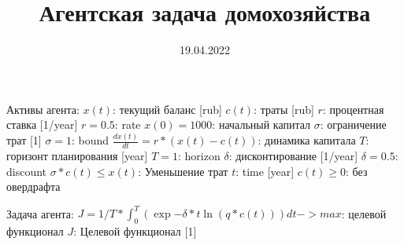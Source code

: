 \documentclass{a_model}
\title{Агентская задача домохозяйства}
\date{19.04.2022}
\begin{document}
Активы агента:
    $x(t)$: текущий баланс [rub]
    $c(t)$: траты [rub]
    $r$: процентная ставка [1/year]
    $r= 0.5$: rate
    $x(0) = 1000$: начальный капитал
    $\sigma$: ограничение трат [1]
    $\sigma = 1$: bound
    $\frac{dx(t)}{dt} = r*(x(t)-c(t))$: динамика капитала
    $T$: горизонт планирования [year]
    $T = 1$: horizon
    $\delta$: дисконтирование [1/year]
    $\delta = 0.5$: discount
    $\sigma*c(t)\leq x(t)$: Уменьшение трат
    $t$: time [year]
    $c(t) \geq 0$: без овердрафта

Задача агента:
    $J = 1/T * \int_0^T (\exp{-\delta*t} \ln(q*c(t)))dt -> max$: целевой функционал
    $J$: Целевой функционал [1]
\end{document}
